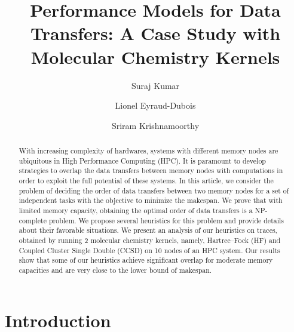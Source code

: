 \documentclass[runningheads]{llncs} %
\begin{document}
	\title{Performance Models for Data Transfers: A Case Study with Molecular Chemistry Kernels}
	\author{Suraj Kumar \and 
		Lionel Eyraud-Dubois \and 
		Sriram Krishnamoorthy } %
	\maketitle              %
	\begin{abstract} 
		With increasing complexity of hardwares, systems with different memory nodes are ubiquitous in High Performance Computing (HPC). It is paramount to develop strategies to overlap the data transfers between memory nodes with computations in order to exploit the full potential of these systems. In this article, we consider the problem of deciding the order of data transfers between two memory nodes for a set of independent tasks with the objective to minimize the makespan. We prove that with limited memory capacity, obtaining the optimal order of data transfers is a NP-complete problem. We propose several heuristics for this problem and provide details about their favorable situations. We present an analysis of our heuristics on traces, obtained by running 2 molecular chemistry kernels, namely, Hartree–Fock (HF) and Coupled Cluster Single Double (CCSD) on 10 nodes of an HPC system. Our results show that some of our heuristics achieve significant overlap for moderate memory capacities and are very close to the lower bound of makespan.

	\end{abstract} %


\section{Introduction}
\label{sec:intro}
\end{document}
